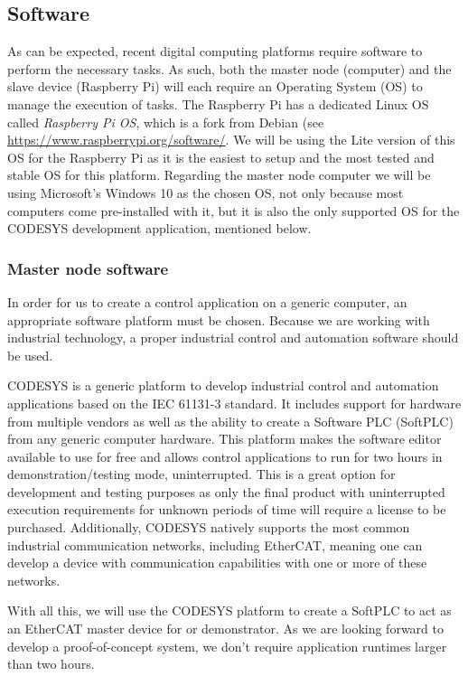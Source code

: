 \subsection{Software} \label{sec:proposed-software}

As can be expected, recent digital computing platforms require software to perform the necessary tasks.
As such, both the master node (computer) and the slave device (Raspberry Pi) will each require an Operating System (OS) to manage the execution of tasks.
The Raspberry Pi has a dedicated Linux OS called \emph{Raspberry Pi OS}, which is a fork from Debian (see \url{https://www.raspberrypi.org/software/}.
We will be using the Lite version of this OS for the Raspberry Pi as it is the easiest to setup and the most tested and stable OS for this platform.
Regarding the master node computer we will be using Microsoft's Windows 10 as the chosen OS, not only because most computers come pre-installed with it, but it is also the only supported OS for the CODESYS development application, mentioned below.

\subsubsection{Master node software}

In order for us to create a control application on a generic computer, an appropriate software platform must be chosen.
Because we are working with industrial technology, a proper industrial control and automation software should be used.

CODESYS is a generic platform to develop industrial control and automation applications based on the IEC 61131-3 standard.
It includes support for hardware from multiple vendors as well as the ability to create a Software PLC (SoftPLC) from any generic computer hardware.
This platform makes the software editor available to use for free and allows control applications to run for two hours in demonstration/testing mode, uninterrupted.
This is a great option for development and testing purposes as only the final product with uninterrupted execution requirements for unknown periods of time will require a license to be purchased.
Additionally, CODESYS natively supports the most common industrial communication networks, including EtherCAT, meaning one can develop a device with communication capabilities with one or more of these networks.

With all this, we will use the CODESYS platform to create a SoftPLC to act as an EtherCAT master device for or demonstrator.
As we are looking forward to develop a proof-of-concept system, we don't require application runtimes larger than two hours.

